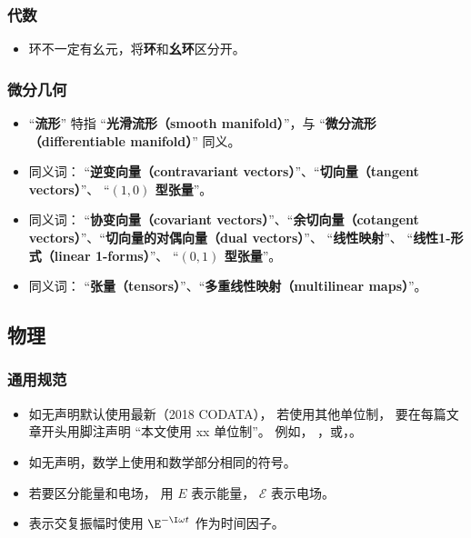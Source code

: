 \subsubsection{代数}
\begin{itemize}
\item 环不一定有幺元，将\textbf{环}和\textbf{幺环}区分开。
\end{itemize}


\subsubsection{微分几何}
\begin{itemize}
\item “\textbf{流形}” 特指 “\textbf{光滑流形（smooth manifold）}”，与 “\textbf{微分流形（differentiable manifold）}” 同义。
\item 同义词： “\textbf{逆变向量（contravariant vectors）}”、“\textbf{切向量（tangent vectors）}”、 “\textbf{$(1, 0)$ 型张量}”。
\item 同义词： “\textbf{协变向量（covariant vectors）}”、“\textbf{余切向量（cotangent vectors）}”、“\textbf{切向量的对偶向量（dual vectors）}”、 “\textbf{线性映射}”、 “\textbf{线性1-形式（linear 1-forms）}”、 “\textbf{$(0, 1)$ 型张量}”。
\item 同义词： “\textbf{张量（tensors）}”、“\textbf{多重线性映射（multilinear maps）}”。
\end{itemize}

\subsection{物理}
\subsubsection{通用规范}
\begin{itemize}
\item 如无声明默认使用最新（2018 CODATA）， 若使用其他单位制， 要在每篇文章开头用脚注声明 “本文使用 xx 单位制”。 例如， ，或，。
\item 如无声明，数学上使用和数学部分相同的符号。
\item 若要区分能量和电场， 用 $E$ 表示能量， $\mathcal E$ 表示电场。
\item 表示交复振幅时使用 $\E^{-\I \omega t}$ 作为时间因子。
\end{itemize}

